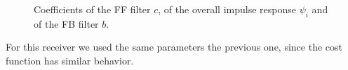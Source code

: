\documentclass[a4paper, 12pt]{report}
\begin{document}
\begin{figure}[H]
	\centering
	\quad
	\caption{Coefficients of the FF filter $c$, of the overall impulse response $\psi_i$ and of the FB filter $b$.}\label{rec_d}
\end{figure}

For this receiver we used the same parameters the previous one, since the cost function has similar behavior.
\end{document}
